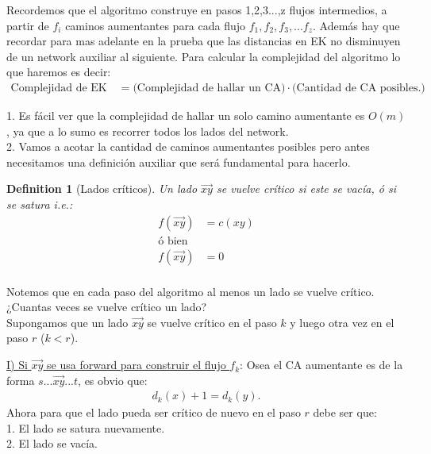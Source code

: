 \documentclass{article}
\newtheorem{definition}{Definition}[section]
\begin{document}
Recordemos que el algoritmo construye en pasos 1,2,3...,z flujos intermedios, a partir de 
$f_i$ caminos aumentantes para cada flujo $f_1,f_2,f_3,...f_z$. Además hay que recordar para
mas adelante en la prueba que las distancias en EK no disminuyen de un network auxiliar al 
siguiente. Para calcular la complejidad del algoritmo lo que haremos es decir:
\begin{equation}
	\begin{aligned}
		\text{Complejidad de EK}\quad = \text{(Complejidad de hallar un CA)} \cdot 
		\text{(Cantidad de CA posibles.)}
	\end{aligned}
\end{equation}

1. Es fácil ver que la complejidad de hallar un solo camino aumentante es $O(m)$, ya que a lo sumo
es recorrer todos los lados del network.\\

2. Vamos a acotar la cantidad de caminos aumentantes posibles pero antes necesitamos una
definición auxiliar que será fundamental para hacerlo.
\begin{definition}[Lados críticos]
	Un lado $\overrightarrow{xy}$ se vuelve crítico si este se vacía, ó si se satura i.e.:
	\begin{equation}
		\begin{aligned}
			f(\overrightarrow{xy}) &= c(xy)\\
			\text{ó bien}& \\
			f(\overrightarrow{xy}) &= 0\\
		\end{aligned}
	\end{equation}
\end{definition}
Notemos que en cada paso del algoritmo al menos un lado se vuelve crítico.\\
¿Cuantas veces se vuelve crítico un lado?\\

Supongamos que un lado $\overrightarrow{xy}$ se vuelve crítico en el paso $k$ y luego otra vez
en el paso $r$ ($k<r$).

\underline{I) Si $\overrightarrow{xy}$ se usa forward para construir el flujo $f_k$}: Osea
el CA aumentante es de la forma $s...\overrightarrow{xy}...t$, es obvio que:
\begin{equation}
	\begin{aligned}
		d_k(x) + 1 = d_k(y).
	\end{aligned}
\end{equation}
Ahora para que el lado pueda ser crítico de nuevo en el paso $r$ debe ser que:\\
1. El lado se satura nuevamente.\\
2. El lado se vacía.\\
\end{document}
